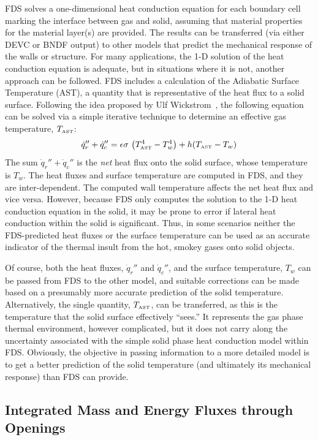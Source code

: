 \documentclass[11pt]{book}
\newcommand{\be}{\begin{equation}}
\newcommand{\ee}{\end{equation}}
\begin{document}
FDS solves a one-dimensional heat conduction equation for each boundary cell marking the interface
between gas and solid, assuming that material properties for the material layer(s) are provided. The results can
be transferred (via either {\ct DEVC} or {\ct BNDF} output) to other models that predict the
mechanical response of the walls or structure. For many applications, the 1-D solution of the heat conduction
equation is adequate, but in situations where it is not, another approach can be followed. FDS includes a
calculation of the Adiabatic Surface Temperature (AST), a quantity that is representative of the heat flux to a
solid surface. Following the idea proposed by Ulf Wickstrom~\cite{SFPE:Wickstrom}, the following equation can
be solved via a simple iterative technique to determine an effective gas temperature, $T_{\hbox{\tiny AST}}$:
\be \dot{q}_r'' + \dot{q}_c'' = \epsilon \sigma \, \left( T_{\hbox{\tiny AST}}^4 - T_w^4 \right) + h (T_{\hbox{\tiny AST}} - T_w )  \ee
The sum $\dot{q}_r'' + \dot{q}_c''$ is the {\em net} heat flux onto the solid surface, whose temperature is
$T_w$. The heat fluxes and surface temperature are computed in FDS, and they are inter-dependent. The computed wall
temperature affects the net heat flux and vice versa. However, because FDS only computes the solution to the
1-D heat conduction equation in the solid, it may be prone to error if lateral heat conduction within the solid is
significant. Thus, in some scenarios neither the FDS-predicted heat fluxes or the surface temperature can be used as
an accurate indicator of the thermal insult from the hot, smokey gases onto solid objects.

Of course, both the heat fluxes, $\dot{q}_r''$ and $\dot{q}_c''$, and the surface temperature, $T_w$ can be passed from FDS to the
other model, and suitable corrections can be made based on a presumably more accurate prediction of the solid temperature.
Alternatively, the single quantity, $T_{\hbox{\tiny AST}}$, can be transferred, as this is the temperature that the solid
surface effectively ``sees.'' It represents the gas phase thermal environment, however complicated, but it does not
carry along the uncertainty associated with the simple solid phase heat conduction model within FDS. Obviously, the
objective in passing information to a more detailed model is to get a better prediction of the solid temperature (and
ultimately its mechanical response) than FDS can provide.



\subsection{Integrated Mass and Energy Fluxes through Openings}
\label{info:flows}
\end{document}
